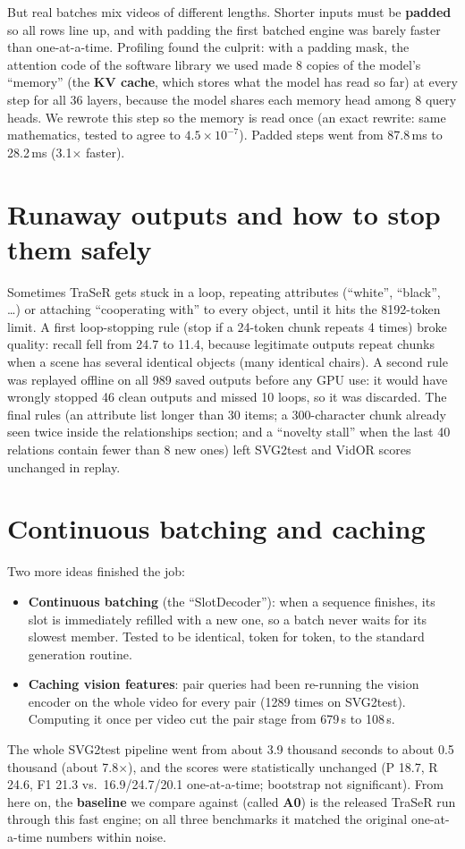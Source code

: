 \documentclass[11pt,openany]{book}
\begin{document}
But real batches mix videos of different lengths. Shorter inputs must be \textbf{padded} so all rows line up, and with padding the
first batched engine was barely faster than one-at-a-time. Profiling found the culprit: with a padding mask, the attention code of
the software library we used made 8 copies of the model's ``memory'' (the \textbf{KV cache}, which stores what the model has read
so far) at every step for all 36 layers, because the model shares each memory head among 8 query heads. We rewrote this step so
the memory is read once (an exact rewrite: same mathematics, tested to agree to $4.5\times10^{-7}$). Padded steps went from 87.8\,ms
to 28.2\,ms (3.1$\times$ faster).

\section{Runaway outputs and how to stop them safely}
Sometimes TraSeR gets stuck in a loop, repeating attributes (``white'', ``black'', \ldots) or attaching ``cooperating with'' to every
object, until it hits the 8192-token limit. A first loop-stopping rule (stop if a 24-token chunk repeats 4 times) broke quality:
recall fell from 24.7 to 11.4, because legitimate outputs repeat chunks when a scene has several identical objects (many identical
chairs). A second rule was replayed offline on all 989 saved outputs before any GPU use: it would have wrongly stopped 46 clean
outputs and missed 10 loops, so it was discarded. The final rules (an attribute list longer than 30 items; a 300-character chunk
already seen twice inside the relationships section; and a ``novelty stall'' when the last 40 relations contain fewer than 8 new
ones) left SVG2test and VidOR scores unchanged in replay.

\section{Continuous batching and caching}
Two more ideas finished the job:
\begin{itemize}
  \item \textbf{Continuous batching} (the ``SlotDecoder''): when a sequence finishes, its slot is immediately refilled with a new
  one, so a batch never waits for its slowest member. Tested to be identical, token for token, to the standard generation routine.
  \item \textbf{Caching vision features}: pair queries had been re-running the vision encoder on the whole video for every pair
  (1289 times on SVG2test). Computing it once per video cut the pair stage from 679\,s to 108\,s.
\end{itemize}
The whole SVG2test pipeline went from about 3.9 thousand seconds to about 0.5 thousand (about 7.8$\times$), and the scores were
statistically unchanged (P 18.7, R 24.6, F1 21.3 vs.\ 16.9/24.7/20.1 one-at-a-time; bootstrap not significant). From here on, the
\textbf{baseline} we compare against (called \textbf{A0}) is the released TraSeR run through this fast engine; on all three
benchmarks it matched the original one-at-a-time numbers within noise.
\end{document}
